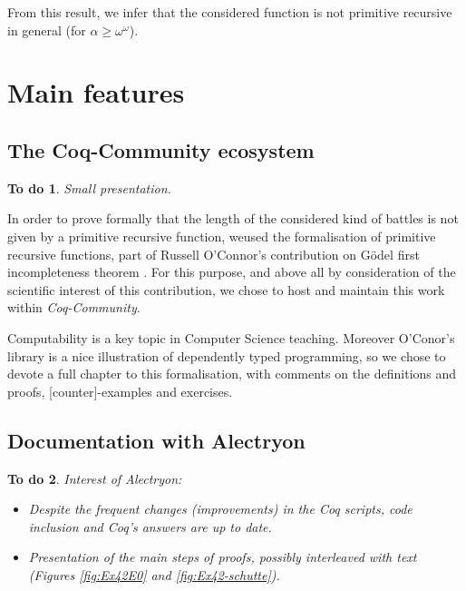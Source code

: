 \documentclass{easychair}
\newtheorem{todo}{To do}
\begin{document}
\label{sect:not-pr}
From this result, we infer that the considered function is not primitive recursive in general (for $\alpha\geq\omega^\omega$).


 
\section{Main features}




\subsection{The Coq-Community ecosystem}
\begin{todo}
Small presentation.
\end{todo}

In order to prove formally that the length of the considered
kind of battles is not given by a primitive recursive function, weused the formalisation of primitive recursive functions, part
of Russell O'Connor's contribution on G\"{o}del first incompleteness theorem \cite{OConnor05, Goedel}.
For this purpose, and above all by consideration of the scientific interest of this contribution, we chose to host and maintain this work within \textit{Coq-Community}.

Computability is a key topic in Computer Science teaching. Moreover O'Conor's library is a nice illustration of dependently typed programming, so we chose to devote a full chapter to this formalisation, with comments on the definitions and proofs, [counter]-examples and exercises.


\subsection{Documentation with Alectryon}
\begin{todo}
  Interest of Alectryon:
  \begin{itemize}
  \item Despite the frequent changes (improvements) in the Coq scripts, code inclusion and \textit{Coq}'s answers are up to date.

  \item Presentation of the main steps of proofs, possibly interleaved with text (Figures \vref{fig:Ex42E0} and \vref{fig:Ex42-schutte}).
    
  \end{itemize}
\end{todo}
\end{document}
